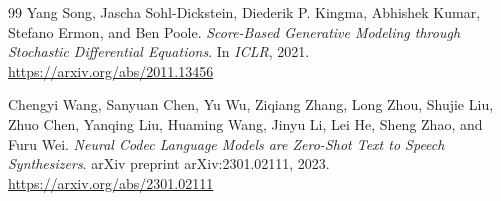 \documentclass[11pt,a4paper]{article}
\begin{document}
\begin{thebibliography}{99}
Yang Song, Jascha Sohl-Dickstein, Diederik P. Kingma, Abhishek Kumar, Stefano Ermon, and Ben Poole.
\newblock \emph{Score-Based Generative Modeling through Stochastic Differential Equations}.
\newblock In \emph{ICLR}, 2021.
\newblock \url{https://arxiv.org/abs/2011.13456}

Chengyi Wang, Sanyuan Chen, Yu Wu, Ziqiang Zhang, Long Zhou, Shujie Liu, Zhuo Chen, Yanqing Liu, Huaming Wang, Jinyu Li, Lei He, Sheng Zhao, and Furu Wei.
\newblock \emph{Neural Codec Language Models are Zero-Shot Text to Speech Synthesizers}.
\newblock arXiv preprint arXiv:2301.02111, 2023.
\newblock \url{https://arxiv.org/abs/2301.02111}

\end{thebibliography}
\end{document}
